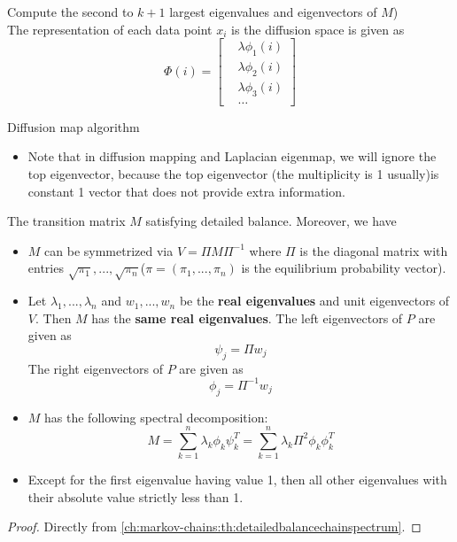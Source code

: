 \begin{refsection}
\begin{algorithm}[H]
 Compute the second to $k+1$ largest eigenvalues and eigenvectors of $M$)\\
 
 The representation of each data point $x_i$ is the diffusion space is given as
 $$\Phi(i) = \begin{bmatrix}
 &\lambda \phi_1(i)\\ 
 &\lambda \phi_2(i)\\
 &\lambda \phi_3(i)\\
 &\dots
 \end{bmatrix}$$
 
 \caption{Diffusion map algorithm}
\end{algorithm}


\begin{remark}\hfill
	\begin{itemize}
		\item Note that in diffusion mapping and Laplacian eigenmap, we will ignore the top eigenvector, because the top eigenvector (the multiplicity is  1 usually)is constant 1 vector that does not provide extra information.
	\end{itemize}
\end{remark}



\begin{lemma}
The transition matrix $M$ satisfying detailed balance. Moreover, we have
\begin{itemize}
	\item $M$ can be symmetrized via
	$V = \Pi M \Pi^{-1}$
	where $\Pi$ is the diagonal matrix with entries $\sqrt{\pi_1},...,\sqrt{\pi_n}$($\pi = (\pi_1,...,\pi_n)$ is the equilibrium probability vector).
	\item Let $\lambda_1,...,\lambda_n$ and $w_1,...,w_n$ be the \textbf{real eigenvalues} and unit eigenvectors of $V$. Then $M$ has the \textbf{same real eigenvalues}. The left eigenvectors of $P$ are given as
	$$\psi_j = \Pi w_j$$
	The right eigenvectors of $P$ are given as 
	$$\phi_j = \Pi^{-1} w_j$$
	\item $M$ has the following spectral decomposition:
	$$M = \sum_{k=1}^n \lambda_k \phi_k\psi_k^T = \sum_{k=1}^n \lambda_k \Pi^2\phi_k\phi_k^T$$
	\item Except for the first eigenvalue having value 1, then all other eigenvalues with their absolute value strictly less than 1.
\end{itemize}
\end{lemma}
\begin{proof}
Directly from \autoref{ch:markov-chains:th:detailedbalancechainspectrum}. 
\end{proof}



\end{refsection}
